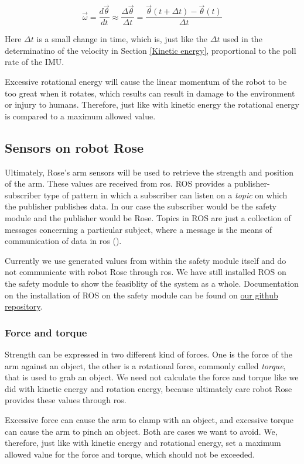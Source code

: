 \documentclass[12pt]{scrreprt}
\begin{document}
\begin{equation}
    \vec{\omega} = \frac{d\vec{\theta}}{dt} \approx \frac{\Delta\vec{\theta}}{\Delta t} = \frac{\vec{\theta}(t + \Delta t ) - \vec{\theta}(t)}{\Delta t}
\end{equation}

Here $\Delta t$ is a small change in time, which is, just like the $\Delta t$ used in the determinatino of the velocity in Section \ref{Kinetic energy}, proportional to the poll rate of the IMU.
\par
Excessive rotational energy will cause the linear momentum of the robot to be too great when it rotates, which results can result in damage to the environment or injury to humans. Therefore, just like with kinetic energy the rotational energy is compared to a maximum allowed value.

\subsection{Sensors on robot Rose}
Ultimately, Rose's arm sensors will be used to retrieve the strength and position of the arm. These values are received from \acrshort{ros}. ROS provides a publisher-subscriber type of pattern in which a subscriber can listen on a \textit{topic} on which the publisher publishes data. In our case the subscriber would be the safety module and the publisher would be Rose. Topics in ROS are just a collection of messages concerning a particular subject, where a message is the means of communication of data in \acrshort{ros} (\cite{agitr}).
\par
Currently we use generated values from within the safety module itself and do not communicate with robot Rose through \acrshort{ros}. We have still installed ROS on the safety module to show the feasiblity of the system as a whole. Documentation on the installation of ROS on the safety module can be found on \href{https://github.com/Yousousen/safety-module-for-care-robot-rose.git}{our github repository}.
\subsubsection{Force and torque}
Strength can be expressed in two different kind of forces. One is the force of the arm against an object, the other is a rotational force, commonly called \textit{torque}, that is used to grab an object. We need not calculate the force and torque like we did with kinetic energy and rotation energy, because ultimately care robot Rose provides these values through \acrshort{ros}.
\par
Excessive force can cause the arm to clamp with an object, and excessive torque can cause the arm to pinch an object. Both are cases we want to avoid. We, therefore, just like with kinetic energy and rotational energy, set a maximum allowed value for the force and torque, which should not be exceeded.
\end{document}
